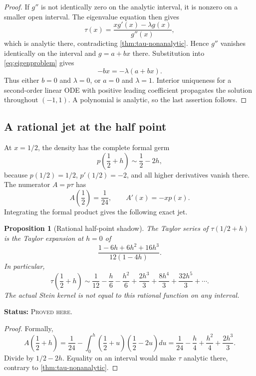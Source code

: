 \documentclass[11pt,oneside]{article}
\newtheorem{proposition}[theorem]{Proposition}
\theoremstyle{definition}
\theoremstyle{remark}
\newcommand{\ProvedHere}{\textcolor{statusgreen}{\textsc{Proved here}}}
\newcommand{\Status}[1]{\par\smallskip\noindent\textbf{Status:} #1.\par\smallskip}
\begin{document}
\begin{proof}
If $g''$ is not identically zero on the analytic interval, it is nonzero on a
smaller open interval.  The eigenvalue equation then gives
\begin{equation}\label{eq:tau-from-eigen}
 \tau(x)=\frac{xg'(x)-\lambda g(x)}{g''(x)},
\end{equation}
which is analytic there, contradicting \cref{thm:tau-nonanalytic}.  Hence $g''$
vanishes identically on the interval and $g=a+bx$ there.  Substitution into
\eqref{eq:eigenproblem} gives
\[
 -bx=-\lambda(a+bx).
\]
Thus either $b=0$ and $\lambda=0$, or $a=0$ and $\lambda=1$.  Interior uniqueness
for a second-order linear ODE with positive leading coefficient propagates the
solution throughout $(-1,1)$.  A polynomial is analytic, so the last assertion
follows.
\end{proof}

\subsection{A rational jet at the half point}
At $x=1/2$, the density has the complete formal germ
\[
 p\!\left(\frac12+h\right)\sim\frac12-2h,
\]
because $p(1/2)=1/2$, $p'(1/2)=-2$, and all higher derivatives vanish there.
The numerator $A=p\tau$ has
\[
 A\!\left(\frac12\right)=\frac1{24},
 \qquad A'(x)=-xp(x).
\]
Integrating the formal product gives the following exact jet.

\begin{proposition}[Rational half-point shadow]\label{prop:tau-half-jet}
The Taylor series of $\tau(1/2+h)$ is the Taylor expansion at $h=0$ of
\begin{equation}\label{eq:tau-half-rational}
 \frac{1-6h+6h^2+16h^3}{12(1-4h)}.
\end{equation}
In particular,
\[
 \tau\!\left(\frac12+h\right)
 \sim \frac1{12}-\frac h6-\frac{h^2}{6}
       +\frac{2h^3}{3}+\frac{8h^4}{3}+\frac{32h^5}{3}+\cdots.
\]
The actual Stein kernel is not equal to this rational function on any interval.
\end{proposition}
\Status{\ProvedHere}

\begin{proof}
Formally,
\[
 A\!\left(\frac12+h\right)
 =\frac1{24}-\int_0^h\left(\frac12+u\right)
                 \left(\frac12-2u\right)du
 =\frac1{24}-\frac h4+\frac{h^2}{4}+\frac{2h^3}{3}.
\]
Divide by $1/2-2h$.  Equality on an interval would make $\tau$ analytic there,
contrary to \cref{thm:tau-nonanalytic}.
\end{proof}
\end{document}
